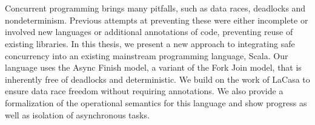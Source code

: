 \chapter{\abstractname}
Concurrent programming brings many pitfalls, such as data races, deadlocks and nondeterminism. Previous attempts at preventing these were either incomplete or involved new languages or additional annotations of code, preventing reuse of existing libraries. In this thesis, we present a new approach to integrating safe concurrency into an existing mainstream programming language, Scala. Our language uses the Async Finish model, a variant of the Fork Join model, that is inherently free of deadlocks and deterministic. We build on the work of LaCasa to ensure data race freedom without requiring annotations. We also provide a formalization of the operational semantics for this language and show progress as well as isolation of asynchronous tasks.
